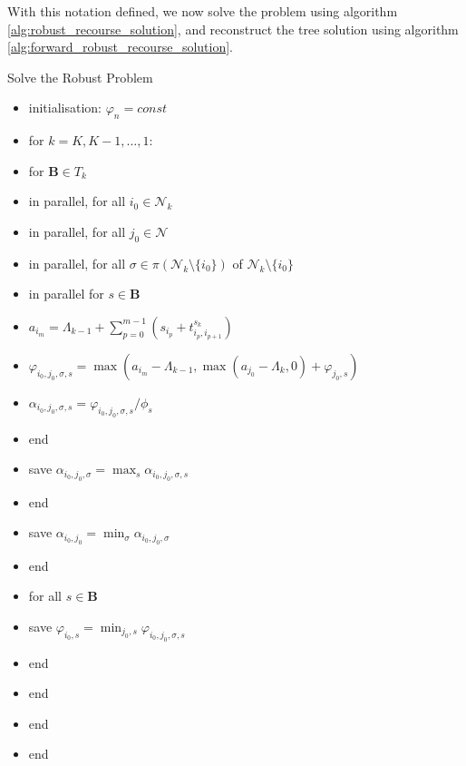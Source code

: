 With this notation defined, we now solve the problem using algorithm \ref{alg:robust_recourse_solution}, and reconstruct the tree solution using algorithm \ref{alg:forward_robust_recourse_solution}. 

\begin{algorithm}{Solve the Robust Problem}{}
	\label{alg:robust_recourse_solution}
	\begin{itemize}
		\item[] initialisation: $\varphi_n = const$
		\item[] for $k=K, K-1, \ldots, 1:$
		\item[] \quad for $\mathbf{B} \in T_k$
		\item[] \quad\quad in parallel, for all $i_0\in{\mathcal N}_k$
		\item[] \quad\quad\quad in parallel, for all $j_0\in{\mathcal N}$
		\item[] \quad\quad\quad\quad in parallel, for all $\sigma\in\pi(\mathcal{N}_k \setminus\{i_0\})$ of ${\mathcal N}_k\setminus\{i_0\}$
		\item[] \quad\quad\quad\quad\quad in parallel for $s \in \mathbf{B}$
		\item[] \quad\quad\quad\quad\quad\quad $a_{i_m}=\Lambda_{k-1}+\sum_{p=0}^{m-1}\left(s_{i_p}+t^{s_k}_{i_{p},i_{p+1}}\right)$
		\item[] \quad\quad\quad\quad\quad\quad $\varphi_{i_0,j_0,\sigma, s}=\max(a_{i_m}-\Lambda_{k-1}, \max(a_{j_0} - \Lambda_k,0) + \varphi_{j_0, s})$
		\item[] \quad\quad\quad\quad\quad\quad
		$\alpha_{i_0,j_0,\sigma,s } = \varphi_{i_0,j_0,\sigma, s}/\phi_s$
		\item[] \quad\quad\quad\quad\quad end
		\item[] \quad\quad\quad\quad\quad save $\alpha_{i_0, j_0, \sigma} = \max_s \alpha_{i_0, j_0, \sigma, s}$
		\item[] \quad\quad\quad\quad end
		\item[] \quad\quad\quad\quad save $ \alpha_{i_0,j_0}=\min_{\sigma}\alpha_{i_0,j_0, \sigma}$
		\item[] \quad\quad\quad end
		\item[] \quad\quad\quad for all $s \in \mathbf{B}$
		\item[] \quad\quad\quad\quad save $\varphi_{i_0, s} = \min_{j_0, s} \varphi_{i_0, j_0, \sigma, s}$	
		\item[] \quad\quad\quad end
		\item[] \quad\quad end
		\item[] \quad end
		\item[] end
	\end{itemize}
\end{algorithm}

